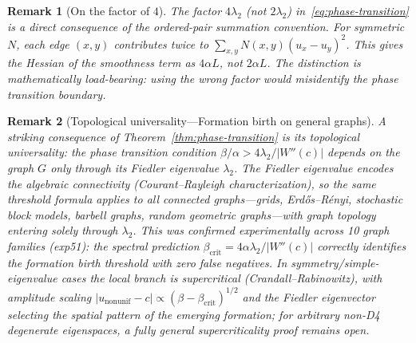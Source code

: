 \documentclass[lettersize,journal]{IEEEtran}
\newtheorem{remark}{Remark}
\begin{document}
\begin{remark}[On the factor of $4$]
The factor $4\lambda_2$ (not $2\lambda_2$) in~\eqref{eq:phase-transition} is a direct consequence of the ordered-pair summation convention. For symmetric $N$, each edge $(x,y)$ contributes twice to $\sum_{x,y} N(x,y)(u_x - u_y)^2$. This gives the Hessian of the smoothness term as $4\alpha L$, not $2\alpha L$. The distinction is mathematically load-bearing: using the wrong factor would misidentify the phase transition boundary.
\end{remark}

\begin{remark}[Topological universality---Formation birth on general graphs]
\label{rmk:formation-birth}
A striking consequence of Theorem~\ref{thm:phase-transition} is its \emph{topological universality}: the phase transition condition $\beta/\alpha > 4\lambda_2/|W''(c)|$ depends on the graph $G$ \emph{only} through its Fiedler eigenvalue $\lambda_2$. The Fiedler eigenvalue encodes the algebraic connectivity (Courant--Rayleigh characterization), so the same threshold formula applies to \emph{all} connected graphs---grids, Erd\H{o}s--R\'enyi, stochastic block models, barbell graphs, random geometric graphs---with graph topology entering solely through $\lambda_2$. This was confirmed experimentally across 10 graph families (exp51): the spectral prediction $\beta_{\mathrm{crit}} = 4\alpha\lambda_2/|W''(c)|$ correctly identifies the formation birth threshold with zero false negatives. In symmetry/simple-eigenvalue cases the local branch is supercritical (Crandall--Rabinowitz), with amplitude scaling $|u_{\mathrm{nonunif}} - c| \propto (\beta - \beta_{\mathrm{crit}})^{1/2}$ and the Fiedler eigenvector selecting the spatial pattern of the emerging formation; for arbitrary non-D4 degenerate eigenspaces, a fully general supercriticality proof remains open.
\end{remark}
\end{document}
